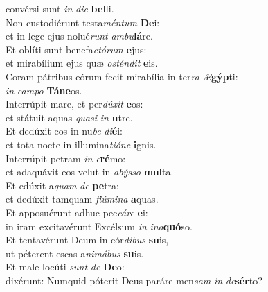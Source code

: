\evenverse convérsi sunt \textit{in} \textit{di}\textit{e} \textbf{bel}li.\\
\oddverse Non custodiérunt testa\textit{mén}\textit{tum} \textbf{De}i:~\*\\
\oddverse et in lege ejus nolué\textit{runt} \textit{am}\textit{bu}\textbf{lá}re.\\
\evenverse Et oblíti sunt benefa\textit{ctó}\textit{rum} \textbf{e}jus:~\*\\
\evenverse et mirabílium ejus quæ \textit{o}\textit{stén}\textit{dit} \textbf{e}is.\\
\oddverse Coram pátribus eórum fecit mirabília in ter\textit{ra} \textit{Æ}\textbf{gýp}ti:~\*\\
\oddverse \textit{in} \textit{cam}\textit{po} \textbf{Tá}\textbf{ne}os.\\
\evenverse Interrúpit mare, et per\textit{dú}\textit{xit} \textbf{e}os:~\*\\
\evenverse et státuit aquas \textit{qua}\textit{si} \textit{in} \textbf{u}tre.\\
\oddverse Et dedúxit eos in nu\textit{be} \textit{di}\textbf{é}i:~\*\\
\oddverse et tota nocte in illumina\textit{ti}\textit{ó}\textit{ne} \textbf{i}gnis.\\
\evenverse Interrúpit petram \textit{in} \textit{e}\textbf{ré}mo:~\*\\
\evenverse et adaquávit eos velut in \textit{a}\textit{býs}\textit{so} \textbf{mul}ta.\\
\oddverse Et edúxit a\textit{quam} \textit{de} \textbf{pe}tra:~\*\\
\oddverse et dedúxit tamquam \textit{flú}\textit{mi}\textit{na} \textbf{a}quas.\\
\evenverse Et apposuérunt adhuc pec\textit{cá}\textit{re} \textbf{e}i:~\*\\
\evenverse in iram excitavérunt Excélsum \textit{in} \textit{i}\textit{na}\textbf{quó}so.\\
\oddverse Et tentavérunt Deum in cór\textit{di}\textit{bus} \textbf{su}is,~\*\\
\oddverse ut péterent escas a\textit{ni}\textit{má}\textit{bus} \textbf{su}is.\\
\evenverse Et male locúti \textit{sunt} \textit{de} \textbf{De}o:~\*\\
\evenverse dixérunt: Numquid póterit Deus paráre men\textit{sam} \textit{in} \textit{de}\textbf{sér}to?\\
